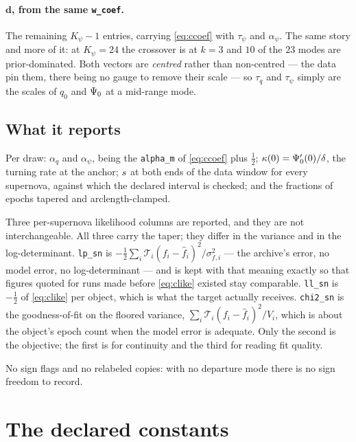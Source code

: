 \documentclass[11pt]{article}
\newcommand{\code}[1]{\texttt{#1}}
\begin{document}
\paragraph{$\mathbf{d}$, from the same \code{w\_coef}.} The remaining $K_{\psi}-1$ entries,
carrying \eqref{eq:ccoef} with $\tau_{\psi}$ and $\alpha_{\psi}$. The same story and more
of it: at $K_{\psi} = 24$ the crossover is at $k = 3$ and $10$ of the $23$ modes are
prior-dominated. Both vectors are \emph{centred} rather than non-centred --- the data pin
them, there being no gauge to remove their scale --- so $\tau_{q}$ and $\tau_{\psi}$ simply
are the scales of $q_{0}$ and $\Psi_{0}$ at a mid-range mode.

\subsection{What it reports}

Per draw: $\alpha_{q}$ and $\alpha_{\psi}$, being the \code{alpha\_m} of
\eqref{eq:ccoef} plus $\frac12$; $\kappa(0) = \Psi_{0}'(0)/\delta$, the turning rate at the
anchor; $s$ at both ends of the data window for every supernova, against which the
declared interval is checked; and the fractions of epochs tapered and arclength-clamped.

Three per-supernova likelihood columns are reported, and they are not interchangeable. All
three carry the taper; they differ in the variance and in the log-determinant.
\code{lp\_sn} is $-\frac12\sum_{i}\mathcal{T}_{i}(f_{i}-\hat f_{i})^{2}/\sigma_{f,i}^{2}$ ---
the archive's error, no model error, no log-determinant --- and is kept with that meaning
exactly so that figures quoted for runs made before \eqref{eq:clike} existed stay
comparable. \code{ll\_sn} is $-\frac12$ of \eqref{eq:clike} per object, which is what the
target actually receives. \code{chi2\_sn} is the
goodness-of-fit on the floored variance, $\sum_{i}\mathcal{T}_{i}(f_{i}-\hat f_{i})^{2}/V_{i}$,
which is about the object's epoch count when the model error is adequate. Only the second
is the objective; the first is for continuity and the third for reading fit quality.

No sign flags and no relabeled copies: with no departure mode there is no sign freedom to
record.

\section{The declared constants}
\label{sec:constants}
\end{document}
